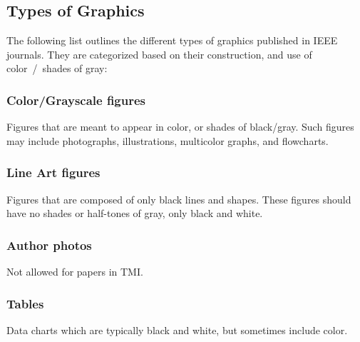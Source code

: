 \documentclass[journal,twoside,web]{ieeecolor}
\begin{document}
\subsection{Types of Graphics}
The following list outlines the different types of graphics published in
IEEE journals. They are categorized based on their construction, and use of
color~/~shades of gray:

\subsubsection{Color/Grayscale figures}
{Figures that are meant to appear in color, or shades of black/gray. Such
    figures may include photographs, illustrations, multicolor graphs, and
    flowcharts.}

\subsubsection{Line Art figures}
{Figures that are composed of only black lines and shapes. These figures
    should have no shades or half-tones of gray, only black and white.}

\subsubsection{Author photos}
{Not allowed for papers in TMI.}

\subsubsection{Tables}
{Data charts which are typically black and white, but sometimes include
    color.}
\end{document}
